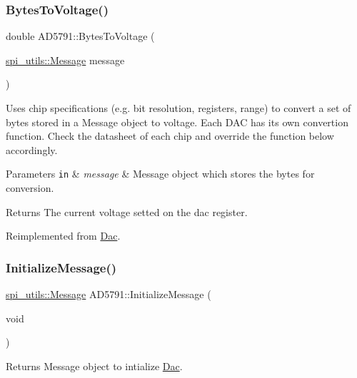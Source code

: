 \subsubsection{\texorpdfstring{Bytes\+To\+Voltage()}{BytesToVoltage()}}
{\footnotesize\ttfamily double A\+D5791\+::\+Bytes\+To\+Voltage (\begin{DoxyParamCaption}\item[{\mbox{\hyperlink{structspi__utils_1_1Message}{spi\+\_\+utils\+::\+Message}}}]{message }\end{DoxyParamCaption})\hspace{0.3cm}{\ttfamily [virtual]}}

Uses chip specifications (e.\+g. bit resolution, registers, range) to convert a set of bytes stored in a Message object to voltage. Each D\+AC has its own convertion function. Check the datasheet of each chip and override the function below accordingly. 
\begin{DoxyParams}[1]{Parameters}
\mbox{\tt in}  & {\em message} & Message object which stores the bytes for conversion. \\
\hline
\end{DoxyParams}
\begin{DoxyReturn}{Returns}
The current voltage setted on the dac register. 
\end{DoxyReturn}


Reimplemented from \mbox{\hyperlink{classDac_a2dc7bd90fddf1e38af8f18a0191ce840}{Dac}}.

\mbox{\label{classAD5791_a770015b1cc9fd808356dab2f2598f894}} 
\subsubsection{\texorpdfstring{Initialize\+Message()}{InitializeMessage()}}
{\footnotesize\ttfamily \mbox{\hyperlink{structspi__utils_1_1Message}{spi\+\_\+utils\+::\+Message}} A\+D5791\+::\+Initialize\+Message (\begin{DoxyParamCaption}\item[{void}]{ }\end{DoxyParamCaption})\hspace{0.3cm}{\ttfamily [virtual]}}

\begin{DoxyReturn}{Returns}
Message object to intialize \mbox{\hyperlink{classDac}{Dac}}. 
\end{DoxyReturn}


